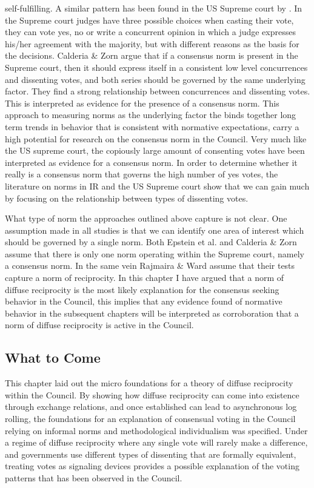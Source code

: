 self-fulfilling. A similar pattern has been found in the US Supreme court by \citet{CalderiaZorn1998}. In the Supreme court judges have three possible choices when casting their vote, they can vote yes, no or write a concurrent opinion in which a judge expresses his/her agreement with the majority, but with different reasons as the basis for the decisions. Calderia \& Zorn argue that if a consensus norm is present in the Supreme court, then it should express itself in a consistent low level concurrences and dissenting votes, and both series should be governed by the same underlying factor. They find a strong relationship between concurrences and dissenting votes. This is interpreted as evidence for the presence of a consensus norm. This approach to measuring norms as the underlying factor the binds together long term trends in behavior that is consistent with normative expectations, carry a high potential for research on the consensus norm in the Council. Very much like the US supreme court, the copiously large amount of consenting votes have been interpreted as evidence for a consensus norm. In order to determine whether it really is a consensus norm that governs the high number of yes votes, the literature on norms in IR and the US Supreme court show that we can gain much by focusing on the relationship between types of dissenting votes. 

What type of norm the approaches outlined above capture is not clear. One assumption made in all studies is that we can identify one area of interest which should be governed by a single norm. Both Epstein et al. and Calderia \& Zorn assume that there is only one norm operating within the Supreme court, namely a consensus norm. In the same vein Rajmaira \& Ward assume that their tests capture a norm of reciprocity. In this chapter I have argued that a norm of diffuse reciprocity is the most likely explanation for the consensus seeking behavior in the Council,  this implies that any evidence found of normative behavior in the subsequent chapters will be interpreted as corroboration that a norm of diffuse reciprocity is active in the Council. 

\subsection{What to Come}
This chapter laid out the micro foundations for a theory of diffuse reciprocity within the Council. By showing how diffuse reciprocity can come into existence through exchange relations, and once established can lead to asynchronous log rolling, the foundations for an explanation of consensual voting in the Council relying on informal norms and methodological individualism was specified. Under a regime of diffuse reciprocity where any single vote will rarely make a difference, and governments use different types of dissenting that are formally equivalent, treating votes as signaling devices provides a possible explanation of the voting patterns that has been observed in the Council.  

